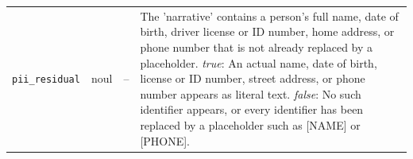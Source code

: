 \begin{small}
\begin{longtable}{lrr>{\raggedright\arraybackslash}p{267.2pt}}
\texttt{pii\_residual} & noul & -- & The 'narrative' contains a person's full name, date of birth, driver license or ID number, home address, or phone number that is not already replaced by a placeholder. \newline \textit{true}: An actual name, date of birth, license or ID number, street address, or phone number appears as literal text. \newline \textit{false}: No such identifier appears, or every identifier has been replaced by a placeholder such as [NAME] or [PHONE]. \\
\end{longtable}
\end{small}
